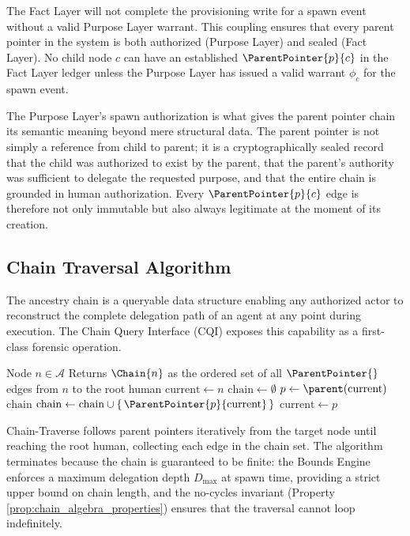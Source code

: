 The Fact Layer will not complete the provisioning write for a spawn event without a valid Purpose Layer warrant. This coupling ensures that every parent pointer in the system is both authorized (Purpose Layer) and sealed (Fact Layer). No child node $c$ can have an established $\ParentPointer{p}{c}$ in the Fact Layer ledger unless the Purpose Layer has issued a valid warrant $\phi_c$ for the spawn event.

The Purpose Layer's spawn authorization is what gives the parent pointer chain its semantic meaning beyond mere structural data. The parent pointer is not simply a reference from child to parent; it is a cryptographically sealed record that the child was authorized to exist by the parent, that the parent's authority was sufficient to delegate the requested purpose, and that the entire chain is grounded in human authorization. Every $\ParentPointer{p}{c}$ edge is therefore not only immutable but also always legitimate at the moment of its creation.

\subsection{Chain Traversal Algorithm}
\label{sec:chain_traversal_algo}

The ancestry chain is a queryable data structure enabling any authorized actor to reconstruct the complete delegation path of an agent at any point during execution. The Chain Query Interface (CQI) exposes this capability as a first-class forensic operation.

\begin{algorithm}[htbp]
\caption{Chain-Traverse($n$)}
\label{alg:chain_traverse}
\begin{algorithmic}[1]
\Require Node $n \in \mathcal{A}$
\Ensure Returns $\Chain{n}$ as the ordered set of all $\ParentPointer{}$ edges from $n$ to the root human
\State $\text{current} \gets n$
\State $\text{chain} \gets \emptyset$
\Loop
    \State $p \gets \parent(\text{current})$
        \State \Return $\text{chain}$ 
    \EndIf
    \State $\text{chain} \gets \text{chain} \cup \{\,\ParentPointer{p}{\text{current}}\,\}$
    \State $\text{current} \gets p$
\EndLoop
\end{algorithmic}
\end{algorithm}

Chain-Traverse follows parent pointers iteratively from the target node until reaching the root human, collecting each edge in the chain set. The algorithm terminates because the chain is guaranteed to be finite: the Bounds Engine enforces a maximum delegation depth $D_{\max}$ at spawn time, providing a strict upper bound on chain length, and the no-cycles invariant (Property \ref{prop:chain_algebra_properties}) ensures that the traversal cannot loop indefinitely.

